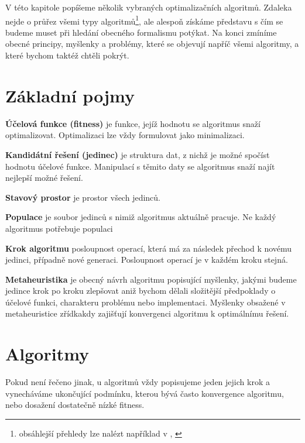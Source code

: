 
V této kapitole popíšeme několik vybraných optimalizačních algoritmů. Zdaleka nejde o průřez všemi typy algoritmů\footnote{obsáhlejší přehledy lze nalézt například v \cite[p.~23]{GO ebook}, \cite{wiki metaheur}}, ale alespoň získáme představu s čím se budeme muset při hledání obecného formalismu potýkat. Na konci zmíníme obecné principy, myšlenky a problémy, které se objevují napříč všemi algoritmy, a které bychom taktéž chtěli pokrýt.

\section{Základní pojmy}

\par{\textbf{Účelová funkce (fitness)} je funkce, jejíž hodnotu se algoritmus snaží optimalizovat. Optimalizaci lze vždy formulovat jako minimalizaci.}

\par{\textbf{Kandidátní řešení (jedinec)} je struktura dat, z nichž je možné spočíst hodnotu účelové funkce. Manipulací s těmito daty se algoritmus snaží najít nejlepší možné řešení.}

\par{\textbf{Stavový prostor} je prostor všech jedinců.}

\par{\textbf{Populace} je soubor jedinců s nimiž algoritmus aktuálně pracuje. Ne každý algoritmus potřebuje populaci}

\par{\textbf{Krok algoritmu}} posloupnost operací, která má za následek přechod k novému jedinci, případně nové generaci. Posloupnost operací je v každém kroku stejná.

\par{\textbf{Metaheuristika} je obecný návrh algoritmu popisující myšlenky, jakými budeme jedince krok po kroku zlepšovat aniž bychom dělali složitější předpoklady o účelové funkci, charakteru problému nebo implementaci. Myšlenky obsažené v metaheuristice zřídkakdy zajišťují konvergenci algoritmu k optimálnímu řešení.}

\section{Algoritmy}

Pokud není řečeno jinak, u algoritmů vždy popisujeme jeden jejich krok a vynecháváme ukončující podmínku, kterou bývá často konvergence algoritmu, nebo dosažení dostatečně nízké fitness.

